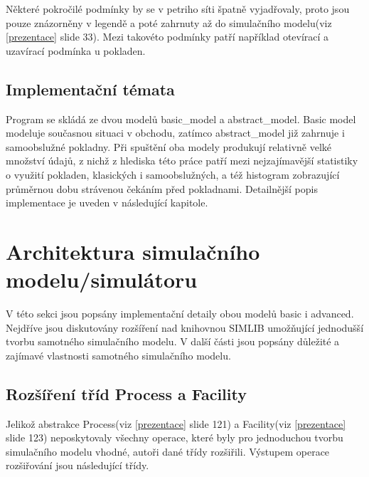 \documentclass[12pt,a4paper,titlepage]{article}
\begin{document}
Některé pokročilé podmínky by se v petriho síti špatně vyjadřovaly, proto jsou pouze znázorněny v legendě a poté zahrnuty až do simulačního modelu(viz \ref{prezentace} slide 33). Mezi takovéto podmínky patří například otevírací a uzavírací podmínka u pokladen.

\subsection{Implementační témata}
Program se skládá ze dvou modelů basic\_model a abstract\_model. Basic model modeluje současnou situaci v obchodu, zatímco abstract\_model již zahrnuje i samoobslužné pokladny. Při spuštění oba modely produkují relativně velké množství údajů, z nichž z hlediska této práce patří mezi nejzajímavější statistiky o využití pokladen, klasických i samoobslužných, a též histogram zobrazující průměrnou dobu strávenou čekáním před pokladnami. Detailnější popis implementace je uveden v následující kapitole. 

\section{Architektura simulačního modelu/simulátoru}
V této sekci jsou popsány implementační detaily obou modelů basic i advanced. Nejdříve jsou diskutovány rozšíření nad knihovnou SIMLIB umožňující jednodušší tvorbu samotného simulačního modelu. V další části jsou popsány důležité a zajímavé vlastnosti samotného simulačního modelu.
\subsection{Rozšíření tříd Process a Facility}
Jelikož abstrakce Process(viz \ref{prezentace} slide 121) a Facility(viz \ref{prezentace} slide 123) neposkytovaly všechny operace, které byly pro jednoduchou tvorbu simulačního modelu vhodné, autoři dané třídy rozšiřili. Výstupem operace rozšiřování jsou následující třídy. 
\end{document}

